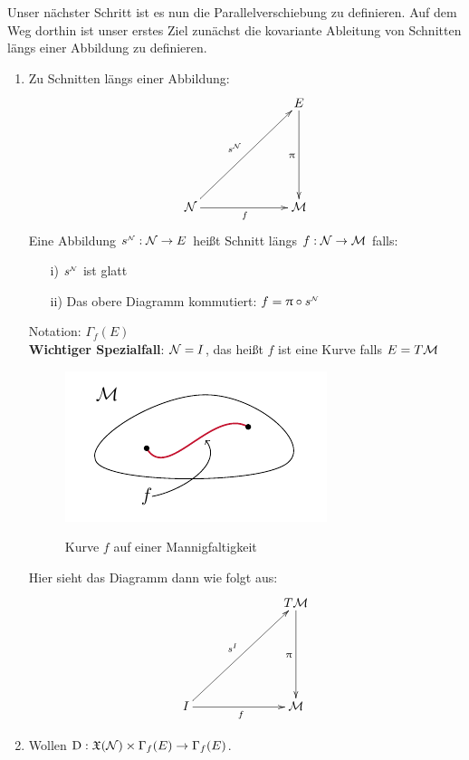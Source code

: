
Unser nächster Schritt ist es nun die Parallelverschiebung zu definieren.
Auf dem Weg dorthin ist unser erstes Ziel zunächst die kovariante Ableitung von Schnitten längs einer Abbildung zu definieren.
\begin{enumerate}
\item Zu Schnitten längs einer Abbildung:
\begin{align}
\begin{xy}
  \xymatrix@=0.2\linewidth{
          &   E \ar[d]_{\pi} \\
      \mfka \ar[ur]^{s^\text{{\begin{tiny}$\mfka$\end{tiny}}}}  \ar[r]_f  &   \mfk
  }
\end{xy}
\end{align}
Eine Abbildung $s^\text{{\begin{tiny}$\mfka$\end{tiny}}} : \mfka \to E$ heißt Schnitt längs $f: \mathcal{N} \to \mathcal{M}$ falls:
\begin{enumerate}
  \item[i)]  $s^\text{{\begin{tiny}$\mfka$\end{tiny}}}$ ist glatt
  \item[ii)]  Das obere Diagramm kommutiert: $f = \pi \circ s^\text{{\begin{tiny}$\mfka$\end{tiny}}}$
\end{enumerate}
Notation: $\Gamma_f (E)$\\
\textbf{Wichtiger Spezialfall}: $\mathcal{N} = I$, das heißt $f$ ist eine Kurve falls $E = T\mathcal{M}$
\begin{figure}[H]
\centering
\includegraphics[width=0.4\linewidth]{figures/tikz/curve_on_manifold.pdf}
\label{img:curve_on_manifold}
\caption{Kurve $f$ auf einer Mannigfaltigkeit}
\end{figure} 
Hier sieht das Diagramm dann wie folgt aus:
\begin{align}
\begin{xy}
  \xymatrix@=0.2\linewidth{
          &   T\mfk \ar[d]_{\pi} \\
      I \ar[ur]^{s^I} \ar[r]_f  &   \mfk
  }
\end{xy}
\end{align}
\item Wollen $\mathrm{D}: \mathfrak{X}(\mathcal{N}) \times \Gamma_f (E) \to \Gamma_f (E)$.
\end{enumerate}
